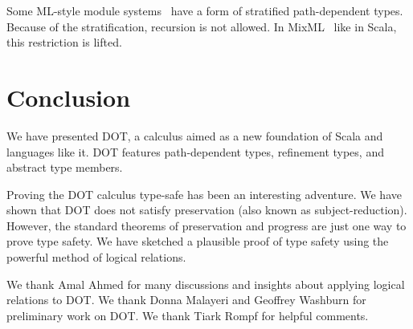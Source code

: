 \documentclass[9pt]{sigplanconf}
\begin{document}
Some ML-style module systems~\cite{homl,mixinml} have a form of
stratified path-dependent types. Because of the stratification,
recursion is not allowed. In MixML~\cite{mixml} like in Scala, this
restriction is lifted.

\section{Conclusion}\label{conclusion}

We have presented DOT, a calculus aimed as a new foundation of Scala
and languages like it. DOT features path-dependent types, refinement
types, and abstract type members.

Proving the DOT calculus type-safe has been an interesting
adventure. We have shown that DOT does not satisfy preservation (also
known as subject-reduction). However, the standard theorems of
preservation and progress are just one way to prove type safety. We
have sketched a plausible proof of type safety using the powerful
method of logical relations.


\acks

We thank Amal Ahmed for many discussions and insights about applying
logical relations to DOT. We thank Donna Malayeri and Geoffrey
Washburn for preliminary work on DOT. We thank Tiark Rompf for helpful
comments.



\end{document}
